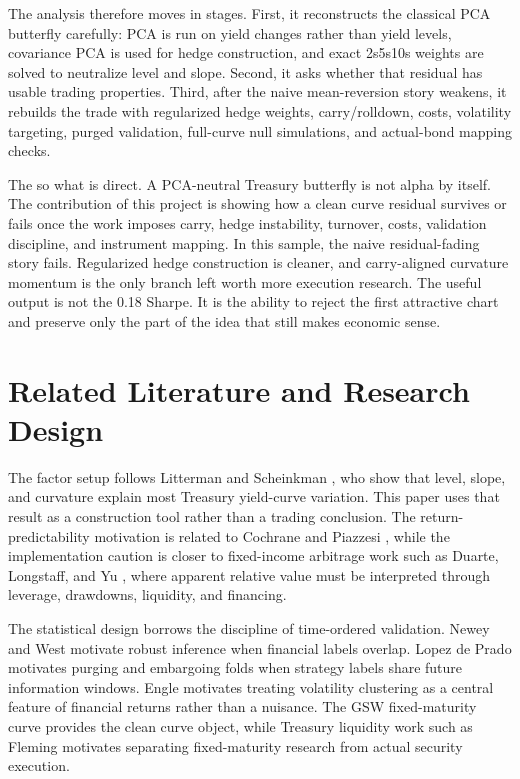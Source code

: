 \documentclass[12pt]{article}
\begin{document}
The analysis therefore moves in stages. First, it reconstructs the classical PCA butterfly carefully:
PCA is run on yield changes rather than yield levels, covariance PCA is used for hedge construction,
and exact 2s5s10s weights are solved to neutralize level and slope. Second, it asks whether that
residual has usable trading properties. Third, after the naive mean-reversion story weakens, it
rebuilds the trade with regularized hedge weights,
carry/rolldown, costs, volatility targeting, purged validation, full-curve null simulations, and
actual-bond mapping checks.

The so what is direct. A PCA-neutral Treasury butterfly is not alpha by itself. The contribution of
this project is showing how a clean curve residual survives or fails once the work imposes carry,
hedge instability, turnover, costs, validation discipline, and instrument mapping. In this sample,
the naive residual-fading story fails. Regularized hedge construction is cleaner, and carry-aligned
curvature momentum is the only branch left worth more execution research. The useful output is not
the 0.18 Sharpe. It is the ability to reject the first attractive chart and preserve only the part of
the idea that still makes economic sense.

\section{Related Literature and Research Design}\label{sec:literature}

The factor setup follows Litterman and Scheinkman \cite{littermanscheinkman1991}, who show that
level, slope, and curvature explain most Treasury yield-curve variation. This paper uses that
result as a construction tool rather than a trading conclusion. The return-predictability motivation
is related to Cochrane and Piazzesi \cite{cochranepiazzesi2005}, while the implementation caution
is closer to fixed-income arbitrage work such as Duarte, Longstaff, and Yu
\cite{duartelongstaffyu2007}, where apparent relative value must be interpreted through leverage,
drawdowns, liquidity, and financing.

The statistical design borrows the discipline of time-ordered validation. Newey and West
\cite{neweywest1987} motivate robust inference when financial labels overlap. Lopez de Prado
\cite{lopezdeprado2018} motivates purging and embargoing folds when strategy labels share future
information windows. Engle \cite{engle1982} motivates treating volatility clustering as a central
feature of financial returns rather than a nuisance. The GSW fixed-maturity curve
\cite{gurkaynak2007} provides the clean curve object, while Treasury liquidity work such as
Fleming \cite{fleming2003} motivates separating fixed-maturity research from actual security
execution.
\end{document}
